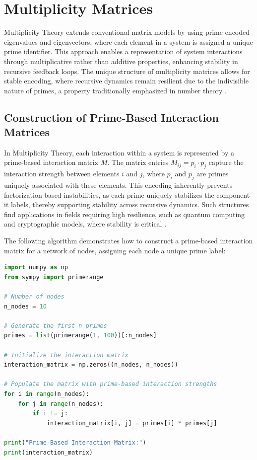 \documentclass{article}
\begin{document}
\section{Multiplicity Matrices}

Multiplicity Theory extends conventional matrix models by using prime-encoded eigenvalues and eigenvectors, where each element in a system is assigned a unique prime identifier. This approach enables a representation of system interactions through multiplicative rather than additive properties, enhancing stability in recursive feedback loops. The unique structure of multiplicity matrices allows for stable encoding, where recursive dynamics remain resilient due to the indivisible nature of primes, a property traditionally emphasized in number theory \citep{gauss1801}.

\subsection{Construction of Prime-Based Interaction Matrices}

In Multiplicity Theory, each interaction within a system is represented by a prime-based interaction matrix \( M \). The matrix entries \( M_{ij} = p_i \cdot p_j \) capture the interaction strength between elements \( i \) and \( j \), where \( p_i \) and \( p_j \) are primes uniquely associated with these elements. This encoding inherently prevents factorization-based instabilities, as each prime uniquely stabilizes the component it labels, thereby supporting stability across recursive dynamics. Such structures find applications in fields requiring high resilience, such as quantum computing and cryptographic models, where stability is critical \citep{freeman2004, morton2020}.

The following algorithm demonstrates how to construct a prime-based interaction matrix for a network of nodes, assigning each node a unique prime label:

\begin{lstlisting}[language=Python, caption=Constructing Prime-Based Interaction Matrix]
import numpy as np
from sympy import primerange

# Number of nodes
n_nodes = 10

# Generate the first n primes
primes = list(primerange(1, 100))[:n_nodes]

# Initialize the interaction matrix
interaction_matrix = np.zeros((n_nodes, n_nodes))

# Populate the matrix with prime-based interaction strengths
for i in range(n_nodes):
    for j in range(n_nodes):
        if i != j:
            interaction_matrix[i, j] = primes[i] * primes[j]

print("Prime-Based Interaction Matrix:")
print(interaction_matrix)
\end{lstlisting}
\end{document}
